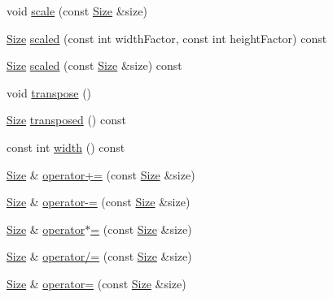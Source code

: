 \begin{DoxyCompactItemize}
void \hyperlink{classprism_1_1_size_a51e5b4604ec60acb92248969420d6d9e}{scale} (const \hyperlink{classprism_1_1_size}{Size} \&size)
\item 
\hyperlink{classprism_1_1_size}{Size} \hyperlink{classprism_1_1_size_ad15785fa5d1a1bb8f453185e39c1a598}{scaled} (const int width\+Factor, const int height\+Factor) const 
\item 
\hyperlink{classprism_1_1_size}{Size} \hyperlink{classprism_1_1_size_a6f87084cf55571eda2a1213f77b01c0e}{scaled} (const \hyperlink{classprism_1_1_size}{Size} \&size) const 
\item 
void \hyperlink{classprism_1_1_size_ab1e9872f48f2ec894849973d6a325af6}{transpose} ()
\item 
\hyperlink{classprism_1_1_size}{Size} \hyperlink{classprism_1_1_size_aaf2b4a70bfe6f18224c25f64901d8d8a}{transposed} () const 
\item 
const int \hyperlink{classprism_1_1_size_a596f8cbdf0baa999e9652c702d58f0f3}{width} () const 
\item 
\hyperlink{classprism_1_1_size}{Size} \& \hyperlink{classprism_1_1_size_a4b286b00f94ede0b1befc2518e59d029}{operator+=} (const \hyperlink{classprism_1_1_size}{Size} \&size)
\item 
\hyperlink{classprism_1_1_size}{Size} \& \hyperlink{classprism_1_1_size_a4db44f1440ff4f3ed7e7879fa2168437}{operator-\/=} (const \hyperlink{classprism_1_1_size}{Size} \&size)
\item 
\hyperlink{classprism_1_1_size}{Size} \& \hyperlink{classprism_1_1_size_ad5b3210ab613aa1e36e38a2ae645d1a0}{operator$\ast$=} (const \hyperlink{classprism_1_1_size}{Size} \&size)
\item 
\hyperlink{classprism_1_1_size}{Size} \& \hyperlink{classprism_1_1_size_a6e29b50d7211ff0eb21a5354828693cd}{operator/=} (const \hyperlink{classprism_1_1_size}{Size} \&size)
\item 
\hyperlink{classprism_1_1_size}{Size} \& \hyperlink{classprism_1_1_size_a27028bedf4be17c142e2ef60383beadb}{operator=} (const \hyperlink{classprism_1_1_size}{Size} \&size)
\end{DoxyCompactItemize}
